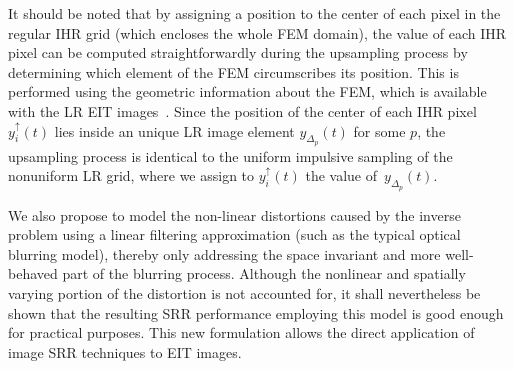 \documentclass[10pt]{IEEEtran}
\newcommand{\cred}{}
\newcommand{\cblue}{}
\newcommand{\cmag}{\textcolor{magenta}}
\begin{document}


It should be noted that by assigning a position to the center of each pixel in the regular IHR grid (which encloses the whole FEM domain), the value of each IHR pixel can be computed straightforwardly during the upsampling process by determining which element of the FEM circumscribes its position. This is performed using the geometric information about the FEM, which is available with the LR EIT images~\cite{Holder04}.
%
Since the position of the center of each IHR pixel $y_{i}^{\uparrow}(t)$ lies inside an unique LR image element $y_{\Delta_p}(t)$ for some $p$, the upsampling process is identical to the uniform impulsive sampling of the nonuniform LR grid, where we assign to $y_{i}^{\uparrow}(t)$ the value of~$y_{\Delta_p}(t)$.










We also propose to model the non-linear distortions caused by the inverse problem using a linear filtering approximation (such as the typical optical blurring model), thereby only addressing the space invariant and more well-behaved part of the blurring process. Although the nonlinear and spatially varying portion of the distortion is not accounted for, it shall nevertheless be shown that the resulting SRR performance employing this model is good enough for practical purposes.
%
%
This new formulation allows the direct application of image SRR techniques to EIT images.
\end{document}
